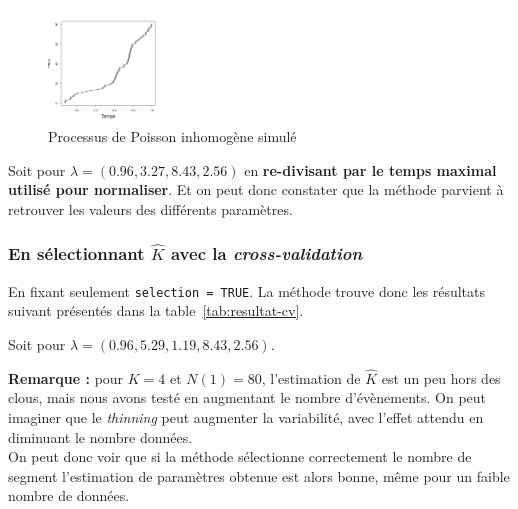 \documentclass[a4paper,10pt]{article}\usepackage[]{graphicx}\usepackage[]{xcolor}
\newenvironment{knitrout}{}{} %
\begin{document}
\begin{figure}
    \centering
\begin{knitrout}
\color{fgcolor}
\includegraphics[width=0.27\textwidth,height=0.2\textheight]{figure/plot-1} 
\end{knitrout}
    \vspace{-10pt}
    \caption{Processus de Poisson inhomogène simulé}
    \label{fig:donnees-simu}
\end{figure}

Soit pour $\lambda = (0.96, 3.27, 8.43, 2.56)$
en \textbf{re-divisant par le temps maximal utilisé pour normaliser}.
Et on peut donc constater que la méthode parvient à retrouver les valeurs des 
différents paramètres. 

\subsubsection*{En sélectionnant $\hat{K}$ avec la \emph{cross-validation}}
En fixant seulement \texttt{selection = TRUE}. La méthode trouve donc les résultats suivant présentés dans la 
table~\ref{tab:resultat-cv}.

Soit pour $\lambda = (0.96, 5.29, 1.19, 8.43, 2.56)$.

\textbf{Remarque :} pour $K = 4$ et $N(1) = 
80$, l'estimation de $\hat{K}$ est un peu hors des clous,
mais nous avons testé en augmentant le nombre d'évènements. On peut imaginer que
le \emph{thinning} peut augmenter la variabilité, avec l'effet attendu en 
diminuant le nombre données.\\

On peut donc voir que si la méthode sélectionne correctement le nombre de 
segment l'estimation de paramètres obtenue est alors bonne, même pour un faible
nombre de données.

\end{document}
